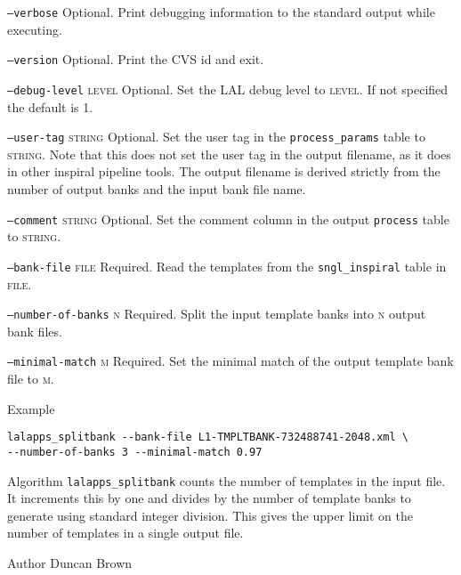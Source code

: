 \begin{entry}
\begin{entry}
\item[\texttt{--verbose}] Optional. Print debugging information to the
standard output while executing.

\item[\texttt{--version}] Optional.  Print the CVS id and exit.

\item[\texttt{--debug-level} \textsc{level}] Optional. Set the LAL debug
level to \textsc{level}. If not specified the default is 1.

\item[\texttt{--user-tag} \textsc{string}] Optional. Set the user tag in
the \texttt{process\_params} table to \textsc{string}. Note that this does
not set the user tag in the output filename, as it does in other inspiral
pipeline tools. The output filename is derived strictly from the number of
output banks and the input bank file name.

\item[\texttt{--comment} \textsc{string}] Optional. Set the comment column in
the output \texttt{process} table to \textsc{string}.

\item[\texttt{--bank-file} \textsc{file}] Required. Read the templates from
the \texttt{sngl\_inspiral} table in \textsc{file}.

\item[\texttt{--number-of-banks} \textsc{n}] Required. Split the input
template banks into \textsc{n} output bank files.

\item[\texttt{--minimal-match} \textsc{m}] Required. Set the minimal match of
the output template bank file to \textsc{m}.
\end{entry}

\item[Example]
\begin{verbatim}
lalapps_splitbank --bank-file L1-TMPLTBANK-732488741-2048.xml \
--number-of-banks 3 --minimal-match 0.97
\end{verbatim}

\item[Algorithm]
\texttt{lalapps\_splitbank} counts the number of templates in the input file.
It increments this by one and divides by the number of template banks to
generate using standard integer division. This gives the upper limit on the
number of templates in a single output file.

\item[Author] 
Duncan Brown
\end{entry}


\clearpage

\clearpage

